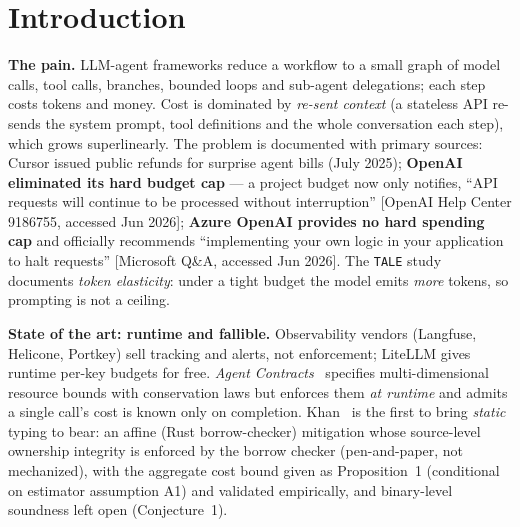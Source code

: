 \documentclass[11pt]{article}
\theoremstyle{plain}
\begin{document}
\begin{abstract}
interleaved/adaptive thinking (budget may exceed \texttt{max\_tokens}) and Gemini when
\texttt{maxOutputTokens} is set without pinning the separate \texttt{thinkingBudget} (\S3.2,
primary docs). Finally, the calculus is realized as \textbf{\texttt{gasket}, an open-source static
checker}, and validated by an \textbf{empirical study of 254 real agent workflows} from 45 public
repositories (\S6): 76\% map onto the calculus and 88\% of cyclic workflows rely on a \emph{framework
default} (often a coarse 1000-superstep LangGraph limit, too loose to be a meaningful budget) for
their only budget bound. To our
knowledge this is the \textbf{first Lean-mechanized aggregate cost-soundness theorem specialized to
per-call-capped LLM-agent workflows}; the proof technique is textbook AARA, the contribution is the
instantiation, the provider-billing semantics, and the tool + study.
\end{abstract}

\section{Introduction}

\textbf{The pain.} LLM-agent frameworks reduce a workflow to a small graph of model calls, tool
calls, branches, bounded loops and sub-agent delegations; each step costs tokens and money. Cost is
dominated by \emph{re-sent context} (a stateless API re-sends the system prompt, tool definitions
and the whole conversation each step), which grows superlinearly. The problem is documented with
primary sources: Cursor issued public refunds for surprise agent bills (July 2025); \textbf{OpenAI
eliminated its hard budget cap} --- a project budget now only notifies, ``API requests will
continue to be processed without interruption'' [OpenAI Help Center 9186755, accessed Jun 2026];
\textbf{Azure OpenAI provides no hard spending cap} and officially recommends ``implementing your
own logic in your application to halt requests'' [Microsoft Q\&A, accessed Jun 2026]. The
\texttt{TALE} study~\cite{tale2024} documents \emph{token elasticity}: under a tight budget the
model emits \emph{more} tokens, so prompting is not a ceiling.

\textbf{State of the art: runtime and fallible.} Observability vendors (Langfuse, Helicone,
Portkey) sell tracking and alerts, not enforcement; LiteLLM gives runtime per-key budgets for free.
\emph{Agent Contracts}~\cite{agentcontracts2026} specifies multi-dimensional resource bounds with
conservation laws but enforces them \emph{at runtime} and admits a single call's cost is known only
on completion. Khan~\cite{khan2026} is the first to bring \emph{static} typing to bear: an affine
(Rust borrow-checker) mitigation whose source-level ownership integrity is enforced by the borrow
checker (pen-and-paper, not mechanized), with the aggregate cost bound given as Proposition~1
(conditional on estimator assumption A1) and validated empirically, and binary-level soundness left
open (Conjecture~1).
\end{document}
